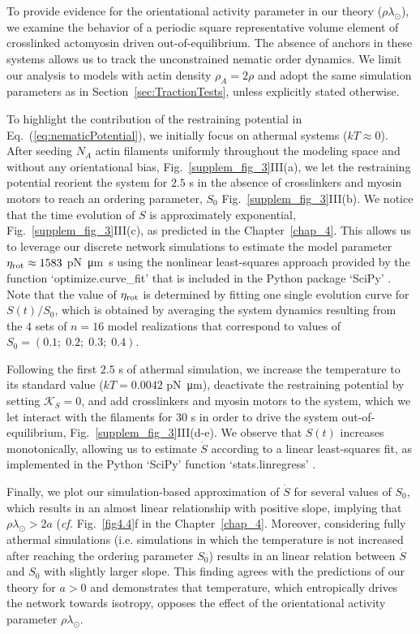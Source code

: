 To provide evidence for the orientational activity parameter in our theory ($\rho \lambda_{\odot}$), we examine the behavior of a periodic square representative volume element of crosslinked actomyosin driven out-of-equilibrium. The absence of anchors in these systems allows us to track the  unconstrained nematic order dynamics. We limit our analysis to models with actin density $\rho_A = 2\rho$ and adopt the same simulation parameters as in Section~\ref{sec:TractionTests}, unless explicitly stated otherwise.

To highlight the contribution of the restraining potential in Eq.~(\ref{eq:nematicPotential}), we initially focus on athermal systems ($kT \approx 0$). After seeding $N_A$ actin filaments uniformly throughout the modeling space and without any orientational bias, Fig.~\ref{supplem_fig_3}III(a), we let the restraining potential reorient the system for $2.5$ \si{\second} in the absence of crosslinkers and myosin motors to reach an ordering parameter, $S_0$ Fig.~\ref{supplem_fig_3}III(b). We notice that the time evolution of $S$ is approximately exponential, Fig.~\ref{supplem_fig_3}III(c), as predicted in the Chapter~\ref{chap_4}. This allows us to leverage our discrete network simulations to estimate the model parameter $\eta_{ \rm rot} \approx 1583$ \si{\pico\newton \micro\meter \second} using the nonlinear least-squares approach provided by the function   `optimize.curve\_fit' that is included in the Python package `SciPy' \cite{scipy2001}. Note that the value of $\eta_{\rm rot}$ is determined by fitting one single evolution curve for $S(t)/S_0$, which is obtained by averaging the system dynamics resulting from the $4$ sets of $n = 16$ model realizations that correspond to values of $S_0 = (0.1; \; 0.2; \; 0.3; \; 0.4)$.

Following the first $2.5$ \si{\second} of athermal simulation, we increase the temperature to its standard value ($kT = 0.0042$ \si{\pico\newton \micro\meter}), deactivate the restraining potential by setting $\mathcal{K}_S = 0$, and add crosslinkers and myosin motors to the system, which we let interact with the filaments for $30$ \si{\second} in order to drive the system out-of-equilibrium,  Fig.~\ref{supplem_fig_3}III(d-e). We observe that $S(t)$ increases monotonically, allowing us to estimate $\dot{S}$ according to a linear least-squares fit, as implemented in the Python `SciPy' function `stats.linregress' \cite{scipy2001}.

Finally, we plot our simulation-based approximation of $\dot{S}$ for several values of $S_0$, which results in an almost linear relationship with positive slope, implying that $\rho \lambda_{\odot} > 2a$ (\textit{cf.} Fig.~\ref{fig4.4}f in the Chapter~\ref{chap_4}. Moreover, considering fully athermal simulations (i.e. simulations in which the temperature is not increased after reaching the ordering parameter $S_0$) results in an linear relation between $\dot{S}$ and $S_0$ with slightly larger slope. This finding agrees with the predictions of our theory for $a>0$ and demonstrates that temperature, which entropically drives the network towards isotropy, opposes the effect of  the orientational activity parameter $\rho \lambda_{\odot}$.


